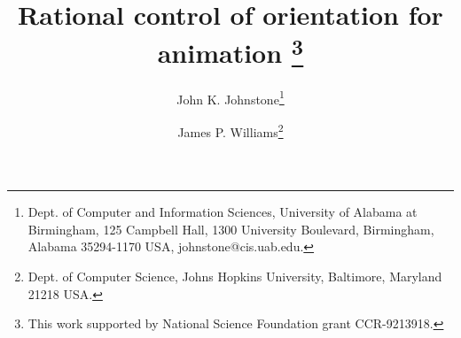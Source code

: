 \newcommand{\SingleSpace}{\edef\baselinestretch{0.9}\Large\normalsize}
\newcommand{\DoubleSpace}{\edef\baselinestretch{1.4}\Large\normalsize}
\newcommand{\Comment}[1]{\relax}  %
\newcommand{\Heading}[1]{\par\noindent{\bf#1}\nobreak}
\newcommand{\Tail}[1]{\nobreak\par\noindent{\bf#1}}
\newcommand{\QED}{\vrule height 1.4ex width 1.0ex depth -.1ex\ } %
\newcommand{\arc}[1]{\mbox{$\stackrel{\frown}{#1}$}}
\newcommand{\lyne}[1]{\mbox{$\stackrel{\leftrightarrow}{#1}$}}
\newcommand{\ray}[1]{\mbox{$\vec{#1}$}}          
\newcommand{\seg}[1]{\mbox{$\overline{#1}$}}
\newcommand{\tab}{\hspace*{.2in}}
\newcommand{\se}{\mbox{$_{\epsilon}$}}  %
\newcommand{\ie}{\mbox{i.e.}}
\newcommand{\eg}{\mbox{e.\ g.\ }}
\newcommand{\figg}[3]{\begin{figure}[htbp]\vspace{#3}\caption{#2}\label{#1}\end{figure}}
\newcommand{\be}{\begin{equation}}
\newcommand{\ee}{\end{equation}}
\newcommand{\prf}{\noindent{{\bf Proof} :\ }}
\newcommand{\choice}[2]{\left( \begin{array}{c} \mbox{\footnotesize{#1}} \\ \mbox{\footnotesize{#2}} \end{array} \right)}      
\newcommand{\ddt}{\frac{\partial}{\partial t}}

\newtheorem{rmk}{Remark}[section]
\newtheorem{example}{Example}[section]
\newtheorem{conjecture}{Conjecture}[section]
\newtheorem{claim}{Claim}[section]
\newtheorem{notation}{Notation}[section]
\newtheorem{lemma}{Lemma}[section]
\newtheorem{theorem}{Theorem}[section]
\newtheorem{corollary}{Corollary}[section]
\newtheorem{defn2}{Definition}

\ifFull                                          
\SingleSpace
\else
\DoubleSpace
\fi

\setlength{\oddsidemargin}{0pt}
\setlength{\evensidemargin}{0pt}
\setlength{\headsep}{0pt}
\setlength{\topmargin}{0pt}
\setlength{\textheight}{8.75in}
\setlength{\textwidth}{6.5in}

% 

\setlength{\headsep}{.2in}

\title{Rational control of orientation for animation
        \thanks{This work supported by National Science Foundation grant
        CCR-9213918.}}                           
\author{John K. Johnstone\thanks{Dept. of Computer and Information 
	Sciences,
	University of Alabama at Birmingham,
	125 Campbell Hall, 1300 University Boulevard,
	Birmingham, Alabama  35294-1170 USA, johnstone@cis.uab.edu.}
	\and James P. Williams\thanks{Dept. of Computer Science,
	Johns Hopkins University, Baltimore, Maryland 21218 USA.}}



